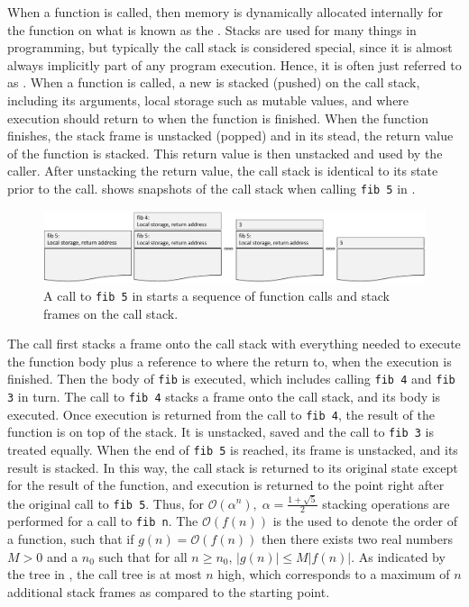 \documentclass[springer.tex]{subfiles}
\begin{document}
When a function is called, then memory is dynamically allocated internally for the function on what is known as the . Stacks are used for many things in programming, but typically the call stack is considered special, since it is almost always implicitly part of any program execution. Hence, it is often just referred to as . When a function is called, a new  is stacked (pushed) on the call stack, including its arguments, local storage such as mutable values, and where execution should return to when the function is finished. When the function finishes, the stack frame is unstacked (popped) and in its stead, the return value of the function is stacked. This return value is then unstacked and used by the caller. After unstacking the return value, the call stack is identical to its state prior to the call.  shows snapshots of the call stack when calling \lstinline{fib 5} in . 
\begin{figure}
  \centering
  \includegraphics[width=\textwidth]{TheCallStack}
  \caption{A call to \lstinline{fib 5} in  starts a sequence of function calls and stack frames on the call stack.}
  \label{fig:TheStack}
\end{figure}
The call first stacks a frame onto the call stack with everything needed to execute the function body plus a reference to where the return to, when the execution is finished. Then the body of \lstinline{fib} is executed, which includes calling \lstinline{fib 4} and \lstinline{fib 3} in turn. The call to \lstinline{fib 4} stacks a frame onto the call stack, and its body is executed. Once execution is returned from the call to \lstinline{fib 4}, the result of the function is on top of the stack. It is unstacked, saved and the call to \lstinline{fib 3} is treated equally. When the end of \lstinline{fib 5} is reached, its frame is unstacked, and its result is stacked. In this way, the call stack is returned to its original state except for the result of the function, and execution is returned to the point right after the original call to \lstinline{fib 5}. Thus, for  $\mathcal{O}\left(\alpha^n\right),\; \alpha=\frac{1+\sqrt{5}}{2}$ stacking operations are performed for a call to \lstinline{fib n}. The $\mathcal{O}\left(f(n)\right)$ is the  used to denote the order of a function, such that if $g(n) = \mathcal{O}(f(n))$ then there exists two real numbers $M>0$ and a $n_0$ such that for all $n\geq n_0$, $|g(n)| \leq M |f(n)|$. As indicated by the tree in , the call tree is at most $n$ high, which corresponds to a maximum of $n$ additional stack frames as compared to the starting point.
\end{document}
